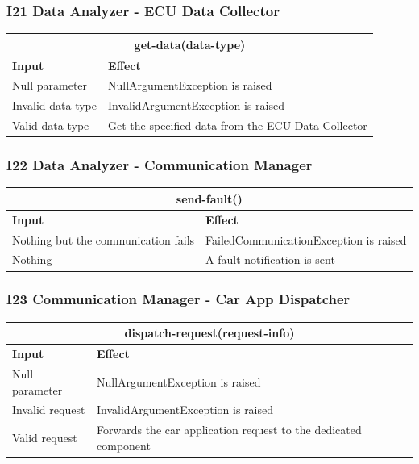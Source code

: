 \documentclass{article}
\begin{document}
\subsubsection{I21 Data Analyzer - ECU Data Collector}
\begin{tabular}{ |p{5cm}|p{7cm}| }
  \hline
  \multicolumn{2}{|c|}{get-data(data-type)} \\
  \hline
  \textbf{Input} & \textbf{Effect} \\
  \hline
  Null parameter & NullArgumentException is raised\\
  \hline
  Invalid data-type & InvalidArgumentException is raised\\
  \hline
   Valid data-type & Get the specified data from the ECU Data Collector\\
  \hline
\end{tabular}
\subsubsection{I22 Data Analyzer - Communication Manager}
\begin{tabular}{ |p{5cm}|p{7cm}| }
  \hline
  \multicolumn{2}{|c|}{send-fault()} \\
  \hline
  \textbf{Input} & \textbf{Effect} \\
  \hline
  Nothing but the communication fails & FailedCommunicationException is raised\\
  \hline
  Nothing & A fault notification is sent\\
  \hline
\end{tabular}
\subsubsection{I23 Communication Manager - Car App Dispatcher}
\begin{tabular}{ |p{5cm}|p{7cm}| }
  \hline
  \multicolumn{2}{|c|}{dispatch-request(request-info)} \\
  \hline
  \textbf{Input} & \textbf{Effect} \\
  \hline
  Null parameter & NullArgumentException is raised\\
  \hline
  Invalid request & InvalidArgumentException is raised \\
  \hline
  Valid request & Forwards the car application request to the dedicated component\\
  \hline
\end{tabular}
\end{document}
